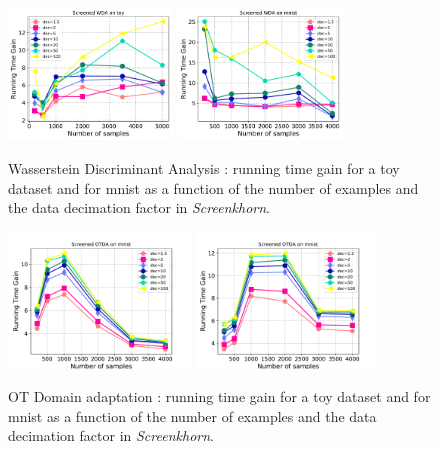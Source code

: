 \begin{figure}[t]
	\centering
	\includegraphics[width=0.39\textwidth]{./figs/wda_gain_toy.pdf}\hspace{1.5cm}
	\includegraphics[width=0.39\textwidth]{./figs/wda_gain_mnist.pdf}
	\caption{Wasserstein Discriminant Analysis : running time gain for a toy dataset and for mnist as a function of the number of examples and the data decimation factor in \emph{Screenkhorn}.}
	\label{fig:wda}
\end{figure}
\begin{figure}[t]
	\centering

	\includegraphics[width=0.43\textwidth]{./figs/da_gain_mnist_regcl1.pdf}\hspace{1cm}
	\includegraphics[width=0.43\textwidth]{./figs/da_gain_mnist_regcl10.pdf}
	\caption{OT Domain adaptation : running time gain for a toy dataset and for mnist as a function of the number of examples and the data decimation factor in \emph{Screenkhorn}.}
	\label{fig:otda}
\end{figure}

